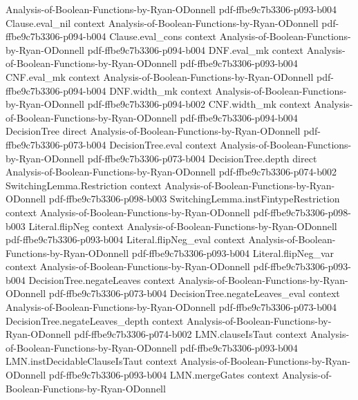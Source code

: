 \begin{lemma}
  {Analysis-of-Boolean-Functions-by-Ryan-ODonnell}
  {pdf-ffbe9c7b3306-p093-b004}
\proofstep
  {Clause.eval_nil}
  {context}
  {Analysis-of-Boolean-Functions-by-Ryan-ODonnell}
  {pdf-ffbe9c7b3306-p094-b004}
\proofstep
  {Clause.eval_cons}
  {context}
  {Analysis-of-Boolean-Functions-by-Ryan-ODonnell}
  {pdf-ffbe9c7b3306-p094-b004}
\proofstep
  {DNF.eval_mk}
  {context}
  {Analysis-of-Boolean-Functions-by-Ryan-ODonnell}
  {pdf-ffbe9c7b3306-p093-b004}
\proofstep
  {CNF.eval_mk}
  {context}
  {Analysis-of-Boolean-Functions-by-Ryan-ODonnell}
  {pdf-ffbe9c7b3306-p094-b004}
\proofstep
  {DNF.width_mk}
  {context}
  {Analysis-of-Boolean-Functions-by-Ryan-ODonnell}
  {pdf-ffbe9c7b3306-p094-b002}
\proofstep
  {CNF.width_mk}
  {context}
  {Analysis-of-Boolean-Functions-by-Ryan-ODonnell}
  {pdf-ffbe9c7b3306-p094-b004}
\proofstep
  {DecisionTree}
  {direct}
  {Analysis-of-Boolean-Functions-by-Ryan-ODonnell}
  {pdf-ffbe9c7b3306-p073-b004}
\proofstep
  {DecisionTree.eval}
  {context}
  {Analysis-of-Boolean-Functions-by-Ryan-ODonnell}
  {pdf-ffbe9c7b3306-p073-b004}
\proofstep
  {DecisionTree.depth}
  {direct}
  {Analysis-of-Boolean-Functions-by-Ryan-ODonnell}
  {pdf-ffbe9c7b3306-p074-b002}
\proofstep
  {SwitchingLemma.Restriction}
  {context}
  {Analysis-of-Boolean-Functions-by-Ryan-ODonnell}
  {pdf-ffbe9c7b3306-p098-b003}
\proofstep
  {SwitchingLemma.instFintypeRestriction}
  {context}
  {Analysis-of-Boolean-Functions-by-Ryan-ODonnell}
  {pdf-ffbe9c7b3306-p098-b003}
\proofstep
  {Literal.flipNeg}
  {context}
  {Analysis-of-Boolean-Functions-by-Ryan-ODonnell}
  {pdf-ffbe9c7b3306-p093-b004}
\proofstep
  {Literal.flipNeg_eval}
  {context}
  {Analysis-of-Boolean-Functions-by-Ryan-ODonnell}
  {pdf-ffbe9c7b3306-p093-b004}
\proofstep
  {Literal.flipNeg_var}
  {context}
  {Analysis-of-Boolean-Functions-by-Ryan-ODonnell}
  {pdf-ffbe9c7b3306-p093-b004}
\proofstep
  {DecisionTree.negateLeaves}
  {context}
  {Analysis-of-Boolean-Functions-by-Ryan-ODonnell}
  {pdf-ffbe9c7b3306-p073-b004}
\proofstep
  {DecisionTree.negateLeaves_eval}
  {context}
  {Analysis-of-Boolean-Functions-by-Ryan-ODonnell}
  {pdf-ffbe9c7b3306-p073-b004}
\proofstep
  {DecisionTree.negateLeaves_depth}
  {context}
  {Analysis-of-Boolean-Functions-by-Ryan-ODonnell}
  {pdf-ffbe9c7b3306-p074-b002}
\proofstep
  {LMN.clauseIsTaut}
  {context}
  {Analysis-of-Boolean-Functions-by-Ryan-ODonnell}
  {pdf-ffbe9c7b3306-p093-b004}
\proofstep
  {LMN.instDecidableClauseIsTaut}
  {context}
  {Analysis-of-Boolean-Functions-by-Ryan-ODonnell}
  {pdf-ffbe9c7b3306-p093-b004}
\proofstep
  {LMN.mergeGates}
  {context}
  {Analysis-of-Boolean-Functions-by-Ryan-ODonnell}

\end{lemma}
